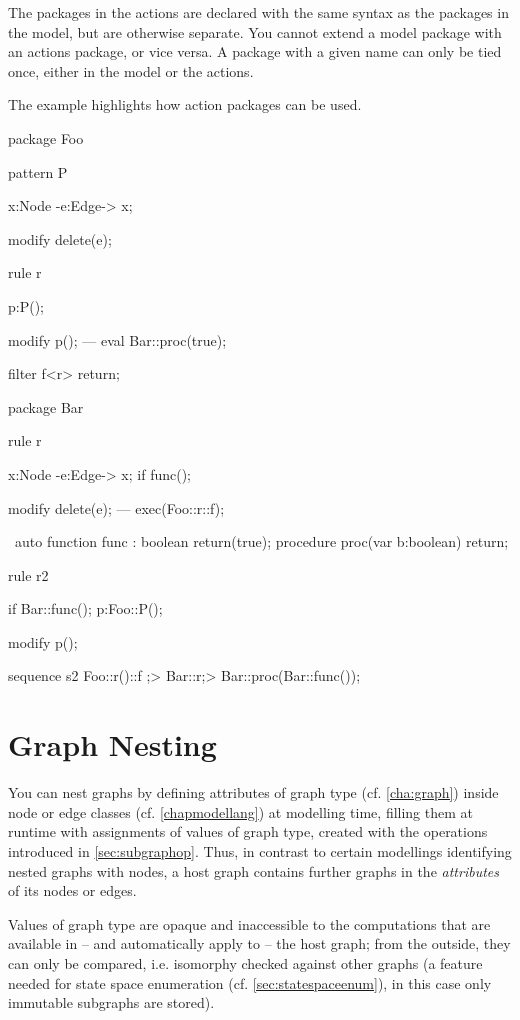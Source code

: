 The packages in the actions are declared with the same syntax as the packages in the model, but are otherwise separate. 
You cannot extend a model package with an actions package, or vice versa.
A package with a given name can only be tied once, either in the model or the actions.

\begin{example}
The example highlights how action packages can be used.
	\begin{grgen}
package Foo {
	pattern P {
		x:Node -e:Edge-> x;

		modify {
			delete(e);
		}
	}
	rule r {
		p:P();

		modify {
			p();
		---
			eval { Bar::proc(true); }
		}
	}
	filter f<r> {
		return;
	}
}

package Bar {
	rule r {
		x:Node -e:Edge-> x;
		if{ func(); }

		modify {
			delete(e);
		---
			exec(Foo::r\Foo::f);
		}
	} \ auto
	function func : boolean {
		return(true);
	}
	procedure proc(var b:boolean) {
		return;
	}	
}

rule r2 {
	if{ Bar::func(); }
	p:Foo::P();
	
	modify {
		p();
	}
}

sequence s2 {
	Foo::r()\Foo::f ;> Bar::r\auto ;> { Bar::proc(Bar::func()); }
}
	\end{grgen}
\end{example}

\section{Graph Nesting}\label{sec:graphnesting}

You can nest graphs by defining attributes of graph type (cf. \ref{cha:graph}) inside node or edge classes (cf. \ref{chapmodellang}) at modelling time, 
filling them at runtime with assignments of values of graph type, created with the operations introduced in \ref{sec:subgraphop}.
Thus, in contrast to certain modellings identifying nested graphs with nodes, a host graph contains further graphs in the \emph{attributes} of its nodes or edges.

Values of graph type are opaque and inaccessible to the computations that are available in -- and automatically apply to -- the host graph; 
from the outside, they can only be compared, i.e. isomorphy checked against other graphs
(a feature needed for state space enumeration (cf. \ref{sec:statespaceenum}), in this case only immutable subgraphs are stored).

